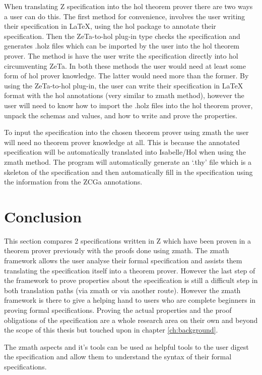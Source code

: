 When translating Z specification into the \gls{hol} theorem prover there are two
ways a user can do this. The first method for convenience, involves the user
writing their specification in \LaTeX{}, using the \gls{hol} package to annotate
their specification. Then the ZeTa-to-\gls{hol} plug-in type checks the
specification and generates .holz files which can be imported by the user into
the \gls{hol} theorem prover. The method is have the user write the
specification directly into \gls{hol} circumventing ZeTa. In both these methods
the user would need at least some form of \gls{hol} prover knowledge. The latter
would need more than the former. By using the ZeTa-to-\gls{hol} plug-in, the
user can write their specification in \LaTeX{} format with the \gls{hol}
annotations (very similar to \gls{zmath} method), however the user will need to
know how to import the .holz files into the \gls{hol} theorem prover, unpack the
schemas and values, and how to write and prove the properties.

To input the specification into the chosen theorem prover using \gls{zmath} the
user will need no theorem prover knowledge at all. This is because the annotated
specification will be automatically translated into Isabelle/Hol when using the
\gls{zmath} method. The program will automatically generate an `.thy' file which
is a skeleton of the specification and then automatically fill in the
specification using the information from the ZCGa annotations.

\section{Conclusion}
This section compares 2 specifications written in Z which have been proven in a
theorem prover previously with the proofs done using \gls{zmath}. The
\gls{zmath} framework allows the user analyse their formal specification and
assists them translating the specification itself into a theorem prover. However
the last step of the framework to prove properties about the specification is
still a difficult step in both translation paths (via \gls{zmath} or via another
route). However the \gls{zmath} framework is there to give a helping hand to
users who are complete beginners in proving formal specifications. Proving the
actual properties and the proof obligations of the specification are a whole
research area on their own and beyond the scope of this thesis but touched upon
in chapter \ref{ch:background}.

The \gls{zmath} aspects and it's tools can be used as helpful tools to the user digest 
the specification and allow them to understand
the syntax of their formal specifications.

